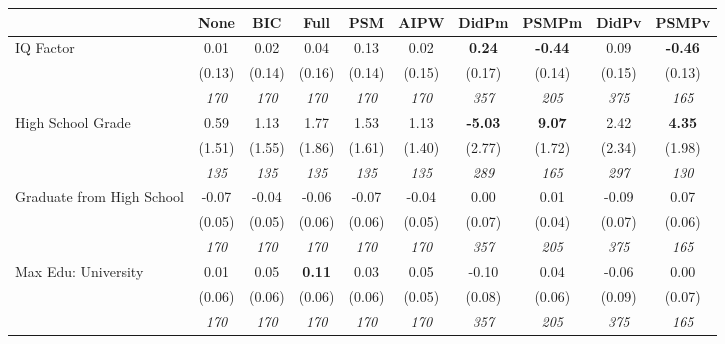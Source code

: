 \begin{tabular}{l c c c c c c c c c}
\toprule
 & None & BIC & Full & PSM & AIPW & DidPm & PSMPm & DidPv & PSMPv \\
\midrule
IQ Factor & 0.01 & 0.02 & 0.04 & 0.13 & 0.02 & \textbf{ 0.24 } & \textbf{-0.44} & 0.09 & \textbf{-0.46} \\
& (0.13) & (0.14) & (0.16) & (0.14) & (0.15) & (0.17) & (0.14) & (0.15) & (0.13) \\
& \textit{ 170 } & \textit{ 170 } & \textit{ 170 } & \textit{ 170 } & \textit{ 170 } & \textit{ 357 } & \textit{ 205 } & \textit{ 375 } & \textit{ 165 } \\
High School Grade & 0.59 & 1.13 & 1.77 & 1.53 & 1.13 & \textbf{ -5.03 } & \textbf{9.07} & 2.42 & \textbf{4.35} \\
& (1.51) & (1.55) & (1.86) & (1.61) & (1.40) & (2.77) & (1.72) & (2.34) & (1.98) \\
& \textit{ 135 } & \textit{ 135 } & \textit{ 135 } & \textit{ 135 } & \textit{ 135 } & \textit{ 289 } & \textit{ 165 } & \textit{ 297 } & \textit{ 130 } \\
Graduate from High School & -0.07 & -0.04 & -0.06 & -0.07 & -0.04 & 0.00 & 0.01 & -0.09 & 0.07 \\
& (0.05) & (0.05) & (0.06) & (0.06) & (0.05) & (0.07) & (0.04) & (0.07) & (0.06) \\
& \textit{ 170 } & \textit{ 170 } & \textit{ 170 } & \textit{ 170 } & \textit{ 170 } & \textit{ 357 } & \textit{ 205 } & \textit{ 375 } & \textit{ 165 } \\
Max Edu: University & 0.01 & 0.05 & \textbf{ 0.11 } & 0.03 & 0.05 & -0.10 & 0.04 & -0.06 & 0.00 \\
& (0.06) & (0.06) & (0.06) & (0.06) & (0.05) & (0.08) & (0.06) & (0.09) & (0.07) \\
& \textit{ 170 } & \textit{ 170 } & \textit{ 170 } & \textit{ 170 } & \textit{ 170 } & \textit{ 357 } & \textit{ 205 } & \textit{ 375 } & \textit{ 165 } \\
\bottomrule
\end{tabular}
